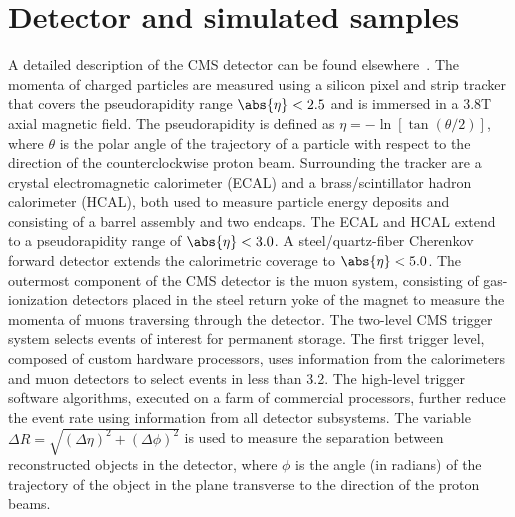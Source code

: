 \documentclass[12pt,twoside,a4paper,cmspaper,final,collab]{cms-tdr}
\begin{document}
\section{Detector and simulated samples}\label{sec:hbb_Simulations}

A detailed description of the CMS detector can be found
elsewhere~\cite{Chatrchyan:2008aa}.
The momenta of charged particles are measured using a silicon pixel
and strip tracker that covers the pseudorapidity range
$\abs{\eta} < 2.5$ and is immersed in a 3.8\unit{T}
axial magnetic field. The pseudorapidity is defined as $\eta = -\ln[\tan(\theta/2)]$, where $\theta$
is the polar angle of the trajectory of a particle with respect to
the direction of the counterclockwise proton beam.
Surrounding the tracker are a crystal electromagnetic calorimeter
(ECAL) and a brass/scintillator hadron calorimeter (HCAL), both used to
measure particle energy deposits and consisting of a barrel assembly and two endcaps. The ECAL
and HCAL extend to a pseudorapidity range of $\abs{\eta} < 3.0$. A
steel/quartz-fiber Cherenkov forward detector extends the calorimetric
coverage to $\abs{\eta} < 5.0$. The outermost component of the CMS detector is the
muon system, consisting of gas-ionization detectors placed in the
steel return yoke of the magnet
to measure the momenta of muons traversing through the detector. The two-level CMS trigger system selects events of interest for
permanent storage. The first trigger level,
composed of custom hardware processors, uses information from the
calorimeters and muon detectors to select events in less than 3.2\mus.
The high-level trigger software algorithms, executed on a farm of
commercial processors, further reduce the
event rate using information from all detector subsystems. The
variable $\Delta R = \sqrt {(\Delta\eta)^2 +(\Delta\phi)^2}$ is used to
measure the separation between reconstructed objects in the detector,
where $\phi$ is the angle (in radians) of the trajectory of the object in the
plane transverse to the direction of the proton beams.
\end{document}
